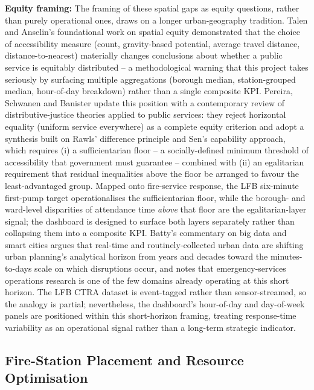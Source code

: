 \textbf{Equity framing:} The framing of these spatial gaps as equity questions, rather than purely operational ones, draws on a longer urban-geography tradition. Talen and Anselin's foundational work on spatial equity \cite{talen1998} demonstrated that the choice of accessibility measure (count, gravity-based potential, average travel distance, distance-to-nearest) materially changes conclusions about whether a public service is equitably distributed -- a methodological warning that this project takes seriously by surfacing multiple aggregations (borough median, station-grouped median, hour-of-day breakdown) rather than a single composite KPI. Pereira, Schwanen and Banister \cite{pereira2017equity} update this position with a contemporary review of distributive-justice theories applied to public services: they reject horizontal equality (uniform service everywhere) as a complete equity criterion and adopt a synthesis built on Rawls' difference principle and Sen's capability approach, which requires (i) a sufficientarian floor -- a socially-defined minimum threshold of accessibility that government must guarantee -- combined with (ii) an egalitarian requirement that residual inequalities above the floor be arranged to favour the least-advantaged group. Mapped onto fire-service response, the LFB six-minute first-pump target operationalises the sufficientarian floor, while the borough- and ward-level disparities of attendance time \emph{above} that floor are the egalitarian-layer signal; the dashboard is designed to surface both layers separately rather than collapsing them into a composite KPI. Batty's commentary on big data and smart cities \cite{batty2013} argues that real-time and routinely-collected urban data are shifting urban planning's analytical horizon from years and decades toward the minutes-to-days scale on which disruptions occur, and notes that emergency-services operations research is one of the few domains already operating at this short horizon. The LFB CTRA dataset is event-tagged rather than sensor-streamed, so the analogy is partial; nevertheless, the dashboard's hour-of-day and day-of-week panels are positioned within this short-horizon framing, treating response-time variability as an operational signal rather than a long-term strategic indicator.

\subsection{Fire-Station Placement and Resource Optimisation}\label{sec:lit-optimisation}

